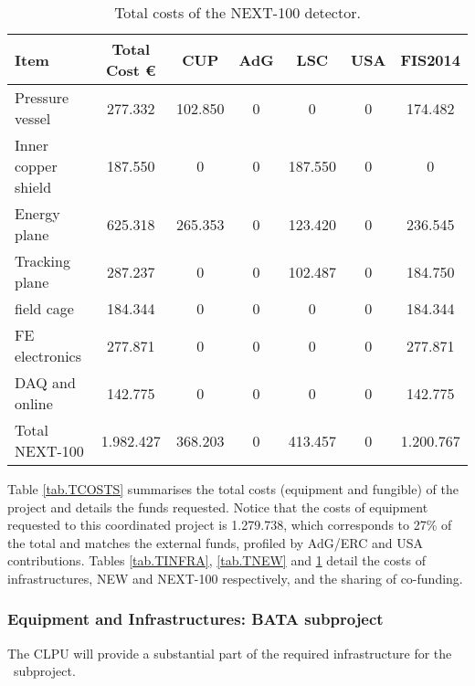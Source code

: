 \begin{table}[h!]
\begin{center}
\begin{tabular}{|l|c|c|c|c|c|c|}
\hline
 Item & Total Cost \euro & CUP	&AdG &	LSC & USA &	FIS2014 \\
 \hline
 Pressure vessel &	 277.332 & 	 102.850 & 	 0 & 	 0 & 	 0 & 	 174.482 \\ 
Inner copper shield &	 187.550 & 	 0 & 	 0 & 	 187.550 & 	 0 & 	 0 \\ 
Energy plane	& 625.318 & 	 265.353 & 	 0 & 	 123.420 & 	 0 & 	 236.545 \\ 
Tracking plane	&  287.237 & 	 0 & 	 0 & 	 102.487 & 	 0 & 	 184.750 \\ 
field cage	 & 184.344 & 	 0 & 	 0 & 	 0 & 	 0 & 	 184.344 \\ 
FE electronics	& 277.871 & 	 0 & 	 0 & 	 0 & 	 0 & 	 277.871 \\
DAQ and online &	 142.775 & 	 0 & 	 0 & 	 0 & 	 0 & 	 142.775 \\ 
Total NEXT-100	 & 1.982.427 & 	 368.203 & 	 0 & 	 413.457 & 	 0 & 	 1.200.767 \\ 
  \hline\hline
\end{tabular}  
\caption{Total costs of the NEXT-100 detector.}
\label{tab.TN100}
\end{center}
\end{table} 
 
Table \ref{tab.TCOSTS} summarises the total costs (equipment and fungible) of the project and details the funds requested. Notice that the costs of equipment requested to this coordinated project is 1.279.738, which corresponds to 27\% of the total and matches the external funds, profiled by AdG/ERC and USA contributions. 
Tables \ref{tab.TINFRA},  \ref{tab.TNEW} and  \ref{tab.TN100} detail the costs of infrastructures, NEW and NEXT-100 respectively, and the sharing of co-funding. 

\subsubsection*{Equipment and Infrastructures: BATA subproject}

The CLPU will provide a substantial part of the required infrastructure for the \BATA\ subproject.
 
